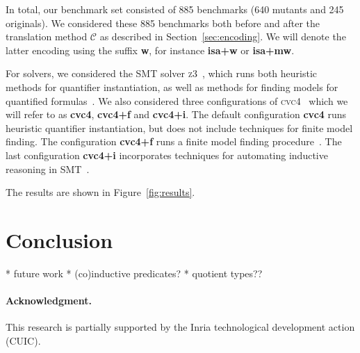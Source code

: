 \documentclass[runningheads,a4paper]{llncs}
\newcommand{\cvc}{\textsc{cvc}{\small 4}\xspace}
\newcommand{\ziii}{\textsc{z}{\small 3}\xspace}
\newcommand{\conv}{\mathcal{C}}
\begin{document}
In total, our benchmark set consisted of 885 benchmarks (640 mutants and 245 originals).
We considered these 885 benchmarks both before and after the translation method $\conv$ as described in Section~\ref{sec:encoding}.
We will denote the latter encoding using the suffix {\bf w}, for instance {\bf isa+w} or {\bf isa+mw}.

For solvers, we considered the SMT solver \ziii~\cite{de-moura-bjoerner-2008}, 
which runs both heuristic methods for quantifier instantiation,
as well as methods for finding models for quantified formulas~\cite{GeDeM-CAV-09}.
We also considered three configurations of \cvc~\cite{barrett-et-al-2011} which we will refer to as {\bf cvc4}, {\bf cvc4+f} and {\bf cvc4+i}.
The default configuration {\bf cvc4} runs heuristic quantifier instantiation, but does not include techniques for finite model finding.
The configuration {\bf cvc4+f} runs a finite model finding procedure~\cite{ReyEtAl-1-RR-13}.
The last configuration {\bf cvc4+i} incorporates techniques for automating inductive reasoning in SMT~\cite{reynolds-kuncak-2015}.


The results are shown in Figure~\ref{fig:results}.


\section{Conclusion}
\label{sec:conclusion}

  * future work
    * (co)inductive predicates?
    * quotient types??

{%
\def\ackname{Acknowledgment}
\paragraph{%
\ackname.}

This research is partially supported by the Inria technological development
action  (CUIC).

}


{


}
\end{document}

